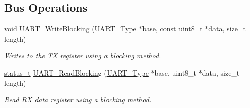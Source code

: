 \subsection*{Bus Operations}
\begin{DoxyCompactItemize}
\item 
void \mbox{\hyperlink{group__uart__driver_gad67794d80b7ee2d3292b41af6ff1e100}{U\+A\+R\+T\+\_\+\+Write\+Blocking}} (\mbox{\hyperlink{struct_u_a_r_t___type}{U\+A\+R\+T\+\_\+\+Type}} $\ast$base, const uint8\+\_\+t $\ast$data, size\+\_\+t length)
\begin{DoxyCompactList}\small\item\em Writes to the TX register using a blocking method. \end{DoxyCompactList}\item 
\mbox{\hyperlink{group__ksdk__common_gaaabdaf7ee58ca7269bd4bf24efcde092}{status\+\_\+t}} \mbox{\hyperlink{group__uart__driver_ga39d59e8a94f1af451a0db81888596639}{U\+A\+R\+T\+\_\+\+Read\+Blocking}} (\mbox{\hyperlink{struct_u_a_r_t___type}{U\+A\+R\+T\+\_\+\+Type}} $\ast$base, uint8\+\_\+t $\ast$data, size\+\_\+t length)
\begin{DoxyCompactList}\small\item\em Read RX data register using a blocking method. \end{DoxyCompactList}\end{DoxyCompactItemize}
